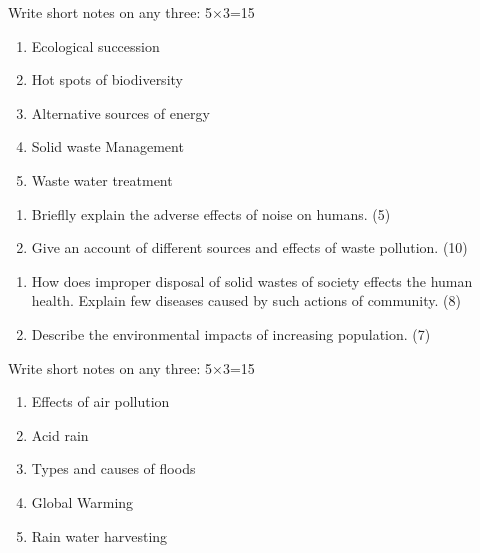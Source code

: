 \documentclass[12pt,a4paper]{article}
\begin{document}
\begin{questions}
    \vspace{\baselineskip}
    
    \item Write short notes on any three: \hfill 5×3=15
    \begin{enumerate}[label=(\roman*), leftmargin=2em]
    \item Ecological succession
    \item Hot spots of biodiversity
    \item Alternative sources of energy
    \item Solid waste Management
    \item Waste water treatment
    \end{enumerate}

    \vspace{\baselineskip}
    
    \item \begin{enumerate}[label=(\alph*), leftmargin=2em]
        \item  Brieflly explain the adverse effects of noise on humans. \hfill (5)
        \item Give an account of different sources and effects of waste pollution. \hfill (10)
    \end{enumerate}

    \vspace{\baselineskip}
    
    \item \begin{enumerate}[label=(\alph*), leftmargin=2em]
        \item How does improper disposal of solid wastes of society effects the human health. Explain few diseases caused by such actions of community. \hfill (8)
        \item Describe the environmental impacts of increasing population. \hfill (7)
    \end{enumerate}

    \vspace{\baselineskip}
    
    \item Write short notes on any three: \hfill 5×3=15
    \begin{enumerate}[label=(\roman*), leftmargin=2em]
    \item Effects of air pollution
    \item Acid rain
    \item Types and causes of floods
    \item Global Warming
    \item Rain water harvesting
    \end{enumerate}

\end{questions}
\end{document}
